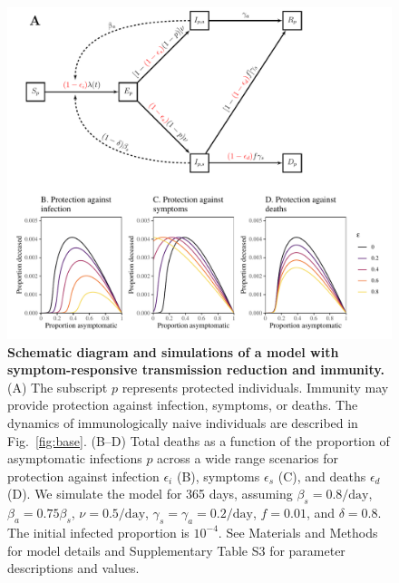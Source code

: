 \documentclass[12pt]{article}
\newcommand{\fref}[1]{Fig.~\ref{fig:#1}}
\begin{document}
\begin{figure}[!ht]
\includegraphics[width=\textwidth]{diagram_immune.pdf}
\caption{
\textbf{Schematic diagram and simulations of a model with symptom-responsive transmission reduction and immunity.}
(A) The subscript $p$ represents protected individuals. 
Immunity may provide protection against infection, symptoms, or deaths.
The dynamics of immunologically naive individuals are described in \fref{base}.
(B--D) Total deaths as a function of the proportion of asymptomatic infections $p$ across a wide range scenarios for protection against infection $\epsilon_i$ (B), symptoms $\epsilon_s$ (C), and deaths $\epsilon_d$ (D).
We simulate the model for 365 days, assuming $\beta_s = 0.8/\mathrm{day}$, $\beta_a = 0.75 \beta_s$, $\nu=0.5/\mathrm{day}$, $\gamma_s=\gamma_a=0.2/\mathrm{day}$, $f=0.01$, and $\delta=0.8$.
The initial infected proportion is $10^{-4}$.
See Materials and Methods for model details and Supplementary Table S3 for parameter descriptions and values.
}
\label{fig:immune}
\end{figure}
\end{document}
